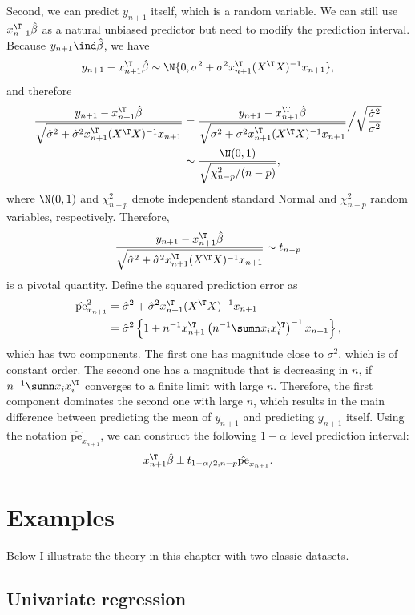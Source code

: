 Second, we can predict $y_{n+1}$ itself, which is a random variable.
We can still use $x_{n+1}^{\T}\hat{\beta}$ as a natural unbiased predictor
but need to modify the prediction interval. Because $y_{n+1}\ind\hat{\beta}$,
we have
\[
y_{n+1}-x_{n+1}^{\T}\hat{\beta}\sim\N\{ 0,\sigma^{2}+\sigma^{2}x_{n+1}^{\T}(X^{\T}X)^{-1}x_{n+1}\} ,
\]
and therefore
\begin{align*}
\frac{y_{n+1}-x_{n+1}^{\T}\hat{\beta}}{\sqrt{\hat{\sigma}^{2}+\hat{\sigma}^{2}x_{n+1}^{\T}(X^{\T}X)^{-1}x_{n+1}}} & =\frac{y_{n+1}-x_{n+1}^{\T}\hat{\beta}}{\sqrt{\sigma^{2}+\sigma^{2}x_{n+1}^{\T}(X^{\T}X)^{-1}x_{n+1}}}\Big/\sqrt{\frac{\hat{\sigma}^{2}}{\sigma^{2}}}\\
 & \sim\frac{\N(0,1)}{\sqrt{\chi_{n-p}^{2}/(n-p)}} , 
\end{align*}
where $\N(0,1)$ and $\chi_{n-p}^{2}$ denote independent standard Normal and $\chi_{n-p}^{2}$ random variables, respectively. Therefore,  
$$
\frac{y_{n+1}-x_{n+1}^{\T}\hat{\beta}}{\sqrt{\hat{\sigma}^{2}+\hat{\sigma}^{2}x_{n+1}^{\T}(X^{\T}X)^{-1}x_{n+1}}}
  \sim t_{n-p}
$$
is a pivotal quantity. Define  the squared prediction error  as
\begin{align*}
\hat{\text{pe}}_{x_{n+1}}^{2} & =\hat{\sigma}^{2}+\hat{\sigma}^{2}x_{n+1}^{\T}(X^{\T}X)^{-1}x_{n+1}\\
 & =\hat{\sigma}^{2}\left\{ 1+n^{-1}x_{n+1}^{\T}\left(n^{-1}\sumn x_{i}x_{i}^{\T}\right)^{-1}x_{n+1}\right\}  ,
\end{align*}
which has two components. 
The first one has magnitude close to $\sigma^{2}$, which is of constant order. The second one has a magnitude that is decreasing in $n$, if $n^{-1}\sumn x_{i}x_{i}^{\T}$ converges to a finite limit
with large $n$. Therefore, the first component dominates the second
one with large $n$, which results in the main difference between
predicting the mean of $y_{n+1}$ and predicting $y_{n+1}$ itself. Using
the notation $\hat{\text{pe}}_{x_{n+1}}$, we can construct the following
$1-\alpha$ level prediction interval: 
\[
 x_{n+1}^{\T}\hat{\beta} \pm  t_{1-\alpha/2,  n-p} \hat{\text{pe}}_{x_{n+1}} .
\]


\section{Examples}
\label{sec::normallinearmodel-r}


Below I illustrate the theory in this chapter with two classic datasets. 


\subsection{Univariate regression}


